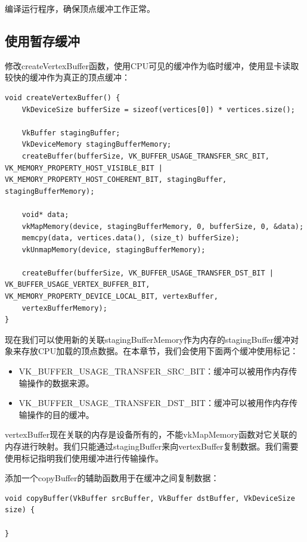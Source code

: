 \documentclass{ctexart}
\begin{document}
编译运行程序，确保顶点缓冲工作正常。

\subsection{使用暂存缓冲}

修改createVertexBuffer函数，使用CPU可见的缓冲作为临时缓冲，使用显卡读取较快的缓冲作为真正的顶点缓冲：

\begin{lstlisting}[language={[ANSI]C}]
void createVertexBuffer() {
	VkDeviceSize bufferSize = sizeof(vertices[0]) * vertices.size();

	VkBuffer stagingBuffer;
	VkDeviceMemory stagingBufferMemory;
	createBuffer(bufferSize, VK_BUFFER_USAGE_TRANSFER_SRC_BIT, VK_MEMORY_PROPERTY_HOST_VISIBLE_BIT | VK_MEMORY_PROPERTY_HOST_COHERENT_BIT, stagingBuffer, stagingBufferMemory);

	void* data;
	vkMapMemory(device, stagingBufferMemory, 0, bufferSize, 0, &data);
	memcpy(data, vertices.data(), (size_t) bufferSize);
	vkUnmapMemory(device, stagingBufferMemory);

	createBuffer(bufferSize, VK_BUFFER_USAGE_TRANSFER_DST_BIT | VK_BUFFER_USAGE_VERTEX_BUFFER_BIT, VK_MEMORY_PROPERTY_DEVICE_LOCAL_BIT, vertexBuffer,
	vertexBufferMemory);
}
\end{lstlisting}

现在我们可以使用新的关联stagingBufferMemory作为内存的stagingBuffer缓冲对象来存放CPU加载的顶点数据。在本章节，我们会使用下面两个缓冲使用标记：

\begin{itemize}
	\item VK\_BUFFER\_USAGE\_TRANSFER\_SRC\_BIT：缓冲可以被用作内存传输操作的数据来源。
	\item VK\_BUFFER\_USAGE\_TRANSFER\_DST\_BIT：缓冲可以被用作内存传输操作的目的缓冲。
\end{itemize}

vertexBuffer现在关联的内存是设备所有的，不能vkMapMemory函数对它关联的内存进行映射。我们只能通过stagingBuffer来向vertexBuffer复制数据。我们需要使用标记指明我们使用缓冲进行传输操作。

添加一个copyBuffer的辅助函数用于在缓冲之间复制数据：

\begin{lstlisting}[language={[ANSI]C}]
void copyBuffer(VkBuffer srcBuffer, VkBuffer dstBuffer, VkDeviceSize size) {

}
\end{lstlisting}
\end{document}
